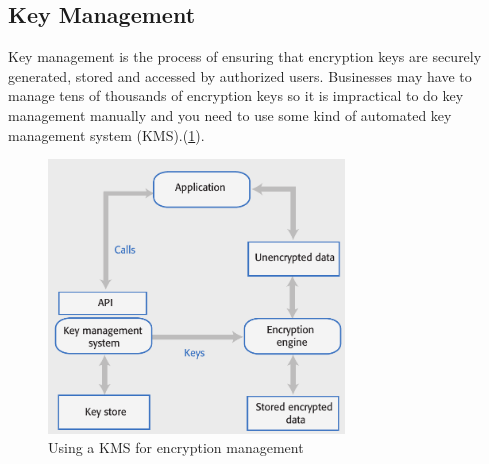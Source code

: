 \documentclass[10pt,a4paper]{report}
\begin{document}
\subsection{Key Management}
Key management is the process of ensuring that encryption keys are securely generated, stored and accessed by authorized users. Businesses may have to manage tens of thousands of encryption keys so it is impractical to do key management manually and you need to use some kind of automated key management system (KMS).(\ref{image93}).
\begin{figure}[h]
	\centering
	\includegraphics[width=0.7\textwidth]{image93}
	\caption{Using a KMS for encryption management}
	\label{image93}
\end{figure} 
\end{document}
